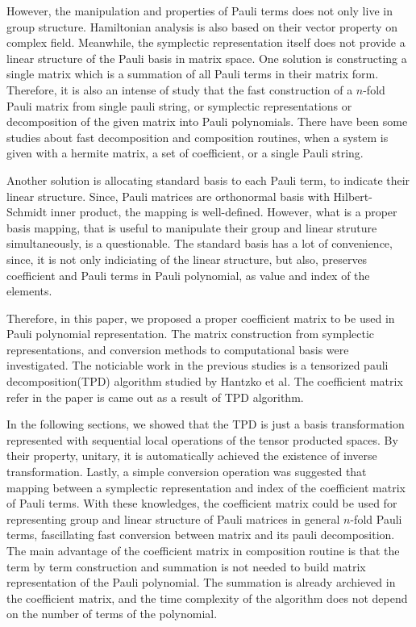 \documentclass[twocolumn]{article}
\begin{document}
However, the manipulation and properties of Pauli terms does not only live in group structure. 
Hamiltonian analysis is also based on their vector property on complex field. 
Meanwhile, the symplectic representation itself does not provide a linear structure
of the Pauli basis in matrix space.
One solution is constructing a single matrix which is a summation of all Pauli terms in their matrix form.%
Therefore, it is also an intense of study that the fast construction of a $n$-fold Pauli matrix from single pauli string, 
or symplectic representations or decomposition of the given matrix into Pauli polynomials.
There have been some studies about fast decomposition\cite{hantzko_tensorized_2023, koska_tree-approach_2024, ying_preparing_2023} %
and composition\cite{vidal_romero_paulicomposer_2023} routines,%
when a system is given with a hermite matrix, a set of coefficient, or a single Pauli string.

Another solution is allocating standard basis to each Pauli term, to indicate their 
linear structure. Since, Pauli matrices are orthonormal basis with Hilbert-Schmidt inner product\cite{nielsen2010quantum},
the mapping is well-defined. However, what is a proper basis mapping, that is useful to manipulate their group and linear 
struture simultaneously, is a questionable. 
The standard basis has a lot of convenience, since, it is not only indiciating of the linear structure, 
but also, preserves coefficient and Pauli terms in Pauli polynomial, as value and index of the elements. 

Therefore, in this paper, we proposed a proper coefficient matrix 
to be used in Pauli polynomial representation.
The matrix construction from symplectic representations, 
and conversion methods to computational basis were investigated. 
The noticiable work in the previous studies is a tensorized pauli decomposition(TPD) algorithm studied by Hantzko et al\cite{hantzko_tensorized_2023}.
The coefficient matrix refer in the paper is came out as a result of TPD algorithm.

In the following sections, we showed that the TPD is just a basis transformation 
represented with sequential local operations of the tensor producted spaces. 
By their property, unitary, it is automatically achieved the existence of inverse transformation.
Lastly, a simple conversion operation was suggested that mapping between a symplectic representation and index of the coefficient matrix
of Pauli terms.
With these knowledges, the coefficient matrix could be used for representing group and linear structure 
of Pauli matrices in general $n$-fold Pauli terms, fascillating fast conversion between matrix and its pauli decomposition.
The main advantage of the coefficient matrix in composition routine is that the term by term construction and summation is not 
needed to build matrix representation of the Pauli polynomial. The summation is already archieved in the coefficient matrix, 
and the time complexity of the algorithm does not depend on the number of terms of the polynomial. 
\end{document}
